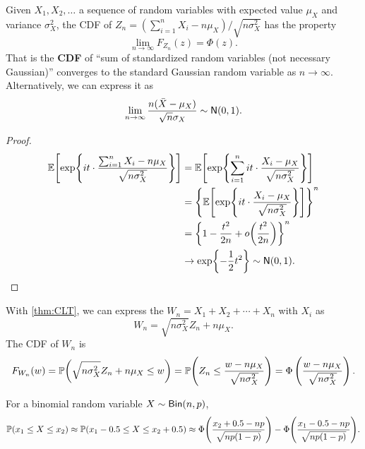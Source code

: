 \begin{theorem}
    \label{thm:CLT}
    Given $X_1, X_2,\ldots$ a sequence of \iid random variables with expected value $\mu_X$ and variance $\sigma_X^2$, the \textnormal{CDF} of $Z_n=(\sum_{i=1}^{n}X_i-n\mu_X)/\sqrt{n\sigma_X^2}$ has the property
    \[\lim_{n\rightarrow \infty}F_{Z_n}(z)=\Phi(z).\]
    That is the \textbf{CDF} of ``sum of standardized \iid random variables (not necessary Gaussian)'' converges to the standard Gaussian random variable as $n\rightarrow\infty$. Alternatively, we can express it as
    \[\lim_{n\rightarrow \infty}\frac{n(\bar{X}-\mu_X)}{\sqrt{n}\sigma_X}\sim \operatorname{\mathsf{N}}(0, 1).\]
\end{theorem}

\begin{proof}
    \begin{align*}
        \E{\exp\braces*{it\cdot \frac{\sum_{i=1}^{n}X_i-n\mu_X}{\sqrt{n\sigma_X^2}}}}
        &= \E{\exp\braces*{\sum_{i=1}^{n} it\cdot \frac{X_i-\mu_X}{\sqrt{n\sigma_X^2}}}} \\
        &= \braces*{\E{\exp\braces*{it\cdot \frac{X_i-\mu_X}{\sqrt{n\sigma_X^2}}}}}^n \\
        &= \braces*{1-\frac{t^2}{2n}+o\parens*{\frac{t^2}{2n}}}^n \\
        &\rightarrow \exp\braces*{-\frac{1}{2}t^2} \sim \Gaus(0,1).
    \end{align*}
\end{proof}

\begin{corollary}
    With \cref{thm:CLT}, we can express the $W_n=X_1+X_2+\cdots+X_n$ with \iid $X_i$ as
    \[W_n=\sqrt{n\sigma_X^2}Z_n+n\mu_X.\]
    The \textnormal{CDF} of $W_n$ is
    \[F_{W_n}(w)=\P{\sqrt{n\sigma_X^2}Z_n+n\mu_X\leq w}=\P{Z_n\leq \frac{w-n\mu_X}{\sqrt{n\sigma_X^2}}}=\Phi\left(\frac{w-n\mu_X}{\sqrt{n\sigma_X^2}}\right).\]
\end{corollary}

\begin{theorem}
    \label{thm:DeMoivreLaplace}
    For a binomial random variable $X\sim \operatorname{\mathsf{Bin}}(n,p)$,
    \[\P{x_1\leq X\leq x_2}\approx \P{x_1-0.5\leq X\leq x_2+0.5}\approx \Phi\parens*{\frac{x_2+0.5-np}{\sqrt{np(1-p)}}}-\Phi\parens*{\frac{x_1-0.5-np}{\sqrt{np(1-p)}}}.\]
\end{theorem}


